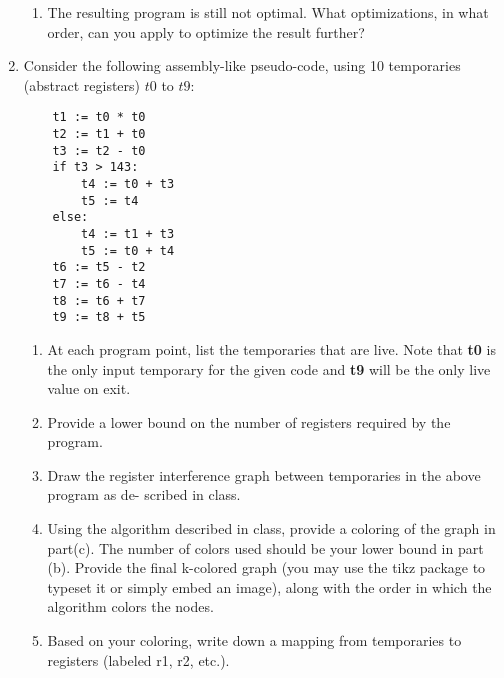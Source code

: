 \documentclass[11pt]{article}
\begin{document}
\begin{enumerate}
\begin{enumerate}
  \item The resulting program is still not optimal. What optimizations, in what order, can you apply to optimize the result further?

\end{enumerate} 
  
  \newpage
  \item  Consider the following assembly-like pseudo-code, using 10 temporaries (abstract registers) $t0$ to $t9$: \\
  
  \begin{lstlisting}
    t1 := t0 * t0
    t2 := t1 + t0
    t3 := t2 - t0
    if t3 > 143:
        t4 := t0 + t3
        t5 := t4
    else:
        t4 := t1 + t3
        t5 := t0 + t4
    t6 := t5 - t2
    t7 := t6 - t4
    t8 := t6 + t7
    t9 := t8 + t5
  \end{lstlisting}
  
  \begin{enumerate}
      \item At each program point, list the temporaries that are live. Note that \textbf{t0} is the only input temporary for the given code and \textbf{t9} will be the only live value on exit.
      \item Provide a lower bound on the number of registers required by the program.
      \item Draw the register interference graph between temporaries in the above program as de- scribed in class.
      \item Using the algorithm described in class, provide a coloring of the graph in part(c). The number of colors used should be your lower bound in part (b). Provide the final k-colored graph (you may use the tikz package to typeset it or simply embed an image), along with the order in which the algorithm colors the nodes.
      \item Based on your coloring, write down a mapping from temporaries to registers (labeled r1, r2, etc.).
  \end{enumerate}
  
\end{enumerate}   
\end{document}
